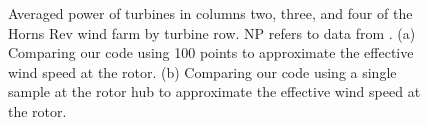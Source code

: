 \documentclass[conf]{new-aiaa}
\begin{document}
\begin{figure}[htbp!]
	\centering
	\caption{Averaged power of turbines in columns two, three, and four of the Horns Rev wind farm by turbine row. NP refers to  data from \cite{niayifar2016}. (a) Comparing our code using 100 points to approximate the effective wind speed at the rotor. (b) Comparing our code using a single sample at the rotor hub to approximate the effective wind speed at the rotor.}
	\label{fig:power_line}
\end{figure}
\end{document}
